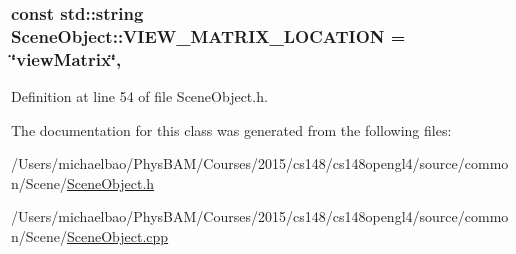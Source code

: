 \subsubsection[{V\+I\+E\+W\+\_\+\+M\+A\+T\+R\+I\+X\+\_\+\+L\+O\+C\+A\+T\+I\+O\+N}]{\setlength{\rightskip}{0pt plus 5cm}const std\+::string Scene\+Object\+::\+V\+I\+E\+W\+\_\+\+M\+A\+T\+R\+I\+X\+\_\+\+L\+O\+C\+A\+T\+I\+O\+N = \char`\"{}view\+Matrix\char`\"{}\hspace{0.3cm}{\ttfamily [static]}, {\ttfamily [protected]}}\label{class_scene_object_a1c129ecdd6bd8e2f34c713f5dd183361}


Definition at line 54 of file Scene\+Object.\+h.



The documentation for this class was generated from the following files\+:\begin{DoxyCompactItemize}
\item 
/\+Users/michaelbao/\+Phys\+B\+A\+M/\+Courses/2015/cs148/cs148opengl4/source/common/\+Scene/\hyperlink{_scene_object_8h}{Scene\+Object.\+h}\item 
/\+Users/michaelbao/\+Phys\+B\+A\+M/\+Courses/2015/cs148/cs148opengl4/source/common/\+Scene/\hyperlink{_scene_object_8cpp}{Scene\+Object.\+cpp}\end{DoxyCompactItemize}
